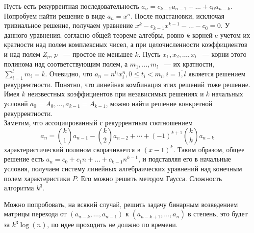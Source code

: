 Пусть есть рекуррентная последовательность
$a_n = c_{k-1}a_{n-1} + \ldots + c_0a_{n-k}$.
Попробуем найти решение в виде $a_n = x^n$. После подстановки,
исключая тривиальное решение,
получаем уравнение $x^k - c_{k-1}x^{k-1} - \ldots - c_0 = 0$.
У данного уравнения, согласно общей теореме алгебры,
ровно $k$ корней c учетом их кратности над полем комплексных чисел,
а при целочисленности коэффициентов и над полем $Z_{p}$, $p$ ~---
простое не меньшее $k$.
Пусть $x_1, x_2, \ldots, x_l$ ~--- корни этого полинома
над соответствующим полем, а $m_1, \ldots, m_l$ ~--- их
кратности, $\sum_{i=1}^{l}m_i = k$. Очевидно, что
$a_n = n^{t_i}x_i^n, 0 \le t_i < m_i, i=\overline{1, l}$
является решением рекуррентности. Понятно, что линейная
комбинация этих решений тоже решение. Имея $k$ неизвестных
коэффициентов при независимых решениях и $k$ начальных
условий $a_0 = A_0, \ldots, a_{k-1}=A_{k-1}$, можно найти решение
конкретной рекуррентности.\\

Заметим, что ассоциированный с рекуррентным соотношением
$$
a_n = \binom{k}{1} a_{n-1} - \binom{k}{2} a_{n-2} + \cdots
+ (-1)^{k+1}\binom{k}{k} a_{n-k}
$$
характеристический полином сворачивается в $(x - 1)^k$.
Таким образом, общее решение есть
$a_n = c_0 + c_1 n + \ldots + c_{k-1}n^{k-1}$, и подставляя
его в начальные условия, получаем систему линейных
алгебраических уравнений над конечным полем характеристики $P$.
Его можно решить методом Гаусса. Сложность алгоритма $k^3$.

Можно попробовать, на всякий случай, решить задачу бинарным возведением
матрицы перехода от $(a_{n-k}, \ldots, a_{n-1})$ к
$(a_{n-k+1},\ldots,a_{n})$ в степень, это будет за $k^3\log(n)$,
по идее проходить не должно по времени.
